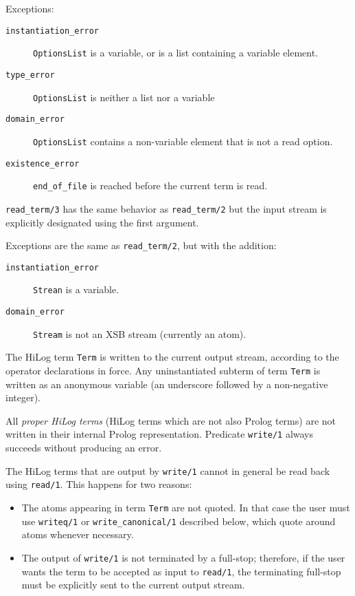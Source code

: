\begin{description}
    Exceptions:
    \begin{description}
    \item[{\tt instantiation\_error}]
	{\tt OptionsList} is a variable, or is a list containing a
			variable element.
    \item[{\tt type\_error}]
	{\tt OptionsList} is neither a list nor a variable
    \item[{\tt domain\_error}]
	{\tt OptionsList} contains a non-variable element that is not
	a read option.
    \item[{\tt existence\_error}]
	{\tt end\_of\_file} is reached before the current term is read.
    \end{description}


%
{\tt read\_term/3} has the same behavior as {\tt read\_term/2} but
the input stream is explicitly designated using the first argument.

Exceptions are the same as {\tt read\_term/2}, but with the addition:
    \begin{description}
    \item[{\tt instantiation\_error}]
	{\tt Strean} is a variable.
    \item[{\tt domain\_error}]
	{\tt Stream} is not an XSB stream (currently an atom).
    \end{description}

    The HiLog term {\tt Term} is written to the current output stream, 
    according to the operator declarations in force.  Any uninstantiated 
    subterm of term {\tt Term} is written as an anonymous variable (an 
    underscore followed by a non-negative integer).  

    All {\em proper HiLog terms} (HiLog terms which are not also Prolog terms) 
    are not written in their internal Prolog representation.  Predicate 
    {\tt write/1} always succeeds without producing an error.

    The HiLog terms that are output by {\tt write/1} cannot in general be 
    read back using {\tt read/1}.  This happens for two reasons:
    \begin{itemize}
    \item The atoms appearing in term {\tt Term} are not quoted. In that case 
          the user must use {\tt writeq/1} or 
          {\tt write\_canonical/1} described below, which quote around atoms 
          whenever necessary.
    \item The output of {\tt write/1} is not terminated by a full-stop;
          therefore, if the user wants the term to be accepted as input to
          {\tt read/1}, the terminating full-stop must be explicitly sent 
          to the current output stream. 
    \end{itemize}


\end{description}
